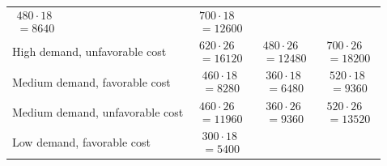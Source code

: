 \begin{ExamProblems}
\begin{center}
\begin{tabular}{l c c c}
				$\begin{array}{l}
					480\cdot 18\\
					= 8640
				\end{array}$ &
				$\begin{array}{l}
					700\cdot 18\\
					= 12600
				\end{array}$ \\
				High demand, unfavorable cost &
				$\begin{array}{l}
					620\cdot 26\\
					= 16120
				\end{array}$ &
				$\begin{array}{l}
					480\cdot 26\\
					= 12480
				\end{array}$ &
				$\begin{array}{l}
					700\cdot 26\\
					= 18200
				\end{array}$ \\
				Medium demand, favorable cost &
				$\begin{array}{l}
					460\cdot 18\\
					= 8280
				\end{array}$ &
				$\begin{array}{l}
					360\cdot 18\\
					= 6480
				\end{array}$ &
				$\begin{array}{l}
					520\cdot 18\\
					= 9360
				\end{array}$ \\
				Medium demand, unfavorable cost &
				$\begin{array}{l}
					460\cdot 26\\
					= 11960
				\end{array}$ &
				$\begin{array}{l}
					360\cdot 26\\
					= 9360
				\end{array}$ &
				$\begin{array}{l}
					520\cdot 26\\
					= 13520
				\end{array}$ \\
				Low demand, favorable cost &
				$\begin{array}{l}
					300\cdot 18\\
					= 5400
				\end{array}$ &

\end{tabular}
\end{center}
\end{ExamProblems}
